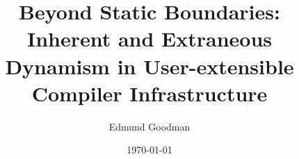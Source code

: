 \documentclass[12pt,a4paper,twoside]{report}
\title{Beyond Static Boundaries: Inherent and Extraneous Dynamism in User-extensible Compiler Infrastructure}
\author{Edmund Goodman}
\date{\today}
\begin{document}






\label{firstcontentpage} %









\label{lastcontentpage} %



\end{document}

